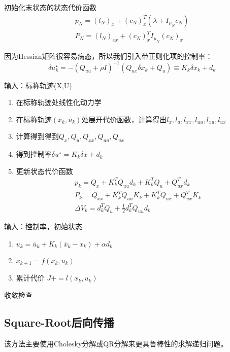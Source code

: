 初始化末状态的状态代价函数
\begin{gather*}
	p_N = (l_N)_x + (c_N)^T_x(\lambda + I_{\mu_N}c_N)\\
	P_N = (l_N)_{xx} + (c_N)^T_xI_{\mu_N}(c_N)_x
\end{gather*}

因为Hessian矩阵很容易病态，所以我们引入带正则化项的控制率：
\begin{equation*}
	\delta u_k^\star = -(Q_{uu} + \rho I)^{-1}(Q_{ux}\delta x_k+Q_u) \equiv K_k\delta x_k + d_k
\end{equation*}
	
\begin{theorembox}[后向传播计算控制率]
	输入：标称轨迹(X,U)
		\begin{enumerate}
			\item 在标称轨迹处线性化动力学 
			\item 在标称轨迹$(\bar{x}_k,\bar{u}_k)$处展开代价函数，计算得出$l_x, l_u, l_{xx}, l_{uu}, l_{xu}, l_{ux}$
			\item 计算得到得到$Q_x, Q_u, Q_{xx}, Q_{uu}, Q_{ux}$
			\item 得到控制率$\delta u^\star = K_k\delta x + d_k$
			\item 更新状态代价函数
			\begin{gather*}
				p_k = Q_x + K_k^TQ_{uu}d_k + K_k^TQ_u + Q^T_{ux}d_k\\
				P_k = Q_{xx} + K_k^TQ_{uu}K_k + K_k^TQ_{ux} + Q^T_{ux}K_k \\
				\Delta V_k = d_k^TQ_u + \frac{1}{2}d_k^TQ_{uu}d_k
			\end{gather*}
		\end{enumerate}
\end{theorembox}

\begin{theorembox}[前向传播rollout轨迹]
	输入：控制率，初始状态
		\begin{enumerate}
			\item $u_k = \bar{u}_k + K_k(\bar{x}_k - x_k) + \alpha d_k$
			\item $x_{k+1} = f(x_k,u_k)$
			\item 累计代价 $J += l(x_k,u_k)$
		\end{enumerate}
	收敛检查
\end{theorembox}

\subsection{Square-Root后向传播}
该方法主要使用Cholesky分解或QR分解来更具鲁棒性的求解递归问题。
